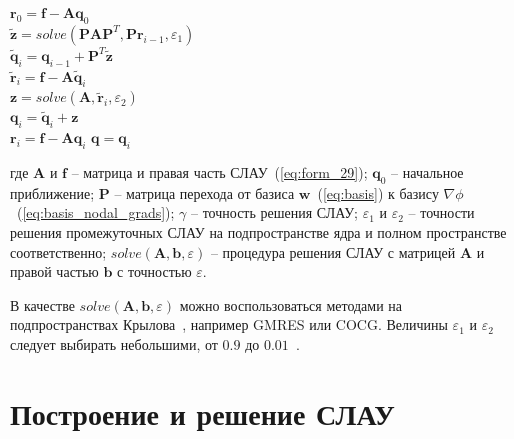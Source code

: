 \documentclass[a4paper,14pt]{article}
\makeatletter
\newcommand{\labelname}[1]{%
	\def\@currentlabelname{#1}}%
\makeatother
\begin{document}
\vspace{1em}
\begin{algorithm}[H]
	\SetAlgoLined
	$\mathbf{r}_0 = \mathbf{f} - \mathbf{A} \mathbf{q}_0$ \\
	{
		$\tilde{\mathbf{z}} = solve(\mathbf{P} \mathbf{A} \mathbf{P}^T , \mathbf{P} \mathbf{r}_{i-1} , \varepsilon_1 )$ \\
		$\tilde{\mathbf{q}}_{i} = \mathbf{q}_{i-1} + \mathbf{P}^T \tilde{\mathbf{z}}$ \\
		$\tilde{\mathbf{r}}_{i} = \mathbf{f} - \mathbf{A} \tilde{\mathbf{q}}_{i}$ \\
		$\mathbf{z} = solve(\mathbf{A}, \tilde{\mathbf{r}}_{i}, \varepsilon_2)$ \\
		$\mathbf{q}_{i} = \tilde{\mathbf{q}}_{i} + \mathbf{z}$ \\
		$\mathbf{r}_{i} = \mathbf{f} - \mathbf{A} \mathbf{q}_{i}$
	}
	$\mathbf{q} = \mathbf{q}_{i}$
\end{algorithm}
\vspace{1em}

\noindent где $\mathbf{A}$ и $\mathbf{f}$ -- матрица и правая часть СЛАУ~(\ref{eq:form_29}); $\mathbf{q}_0$ -- начальное приближение;  $\mathbf{P}$ -- матрица перехода от базиса $\mathbf{w}$~(\ref{eq:basis}) к базису $\nabla \phi$~(\ref{eq:basis_nodal_grads}); $\gamma$ -- точность решения СЛАУ; $\varepsilon_1$ и $\varepsilon_2$ -- точности решения промежуточных СЛАУ на подпространстве ядра и полном пространстве соответственно; $solve(\mathbf{A}, \mathbf{b}, \varepsilon)$ -- процедура решения СЛАУ с матрицей $\mathbf{A}$ и правой частью $\mathbf{b}$ с точностью $\varepsilon$.

В качестве $solve(\mathbf{A}, \mathbf{b}, \varepsilon)$ можно воспользоваться методами на подпространствах Крылова~\citep{balandin_slae, solver_saad, solver_iterative, solver_templates}, например GMRES или COCG. Величины $\varepsilon_1$ и $\varepsilon_2$ следует выбирать небольшими, от $0.9$ до $0.01$~\citep{nechaev}.
%


\clearpage
\section{Построение и решение СЛАУ}
\labelname{2}\label{sec:build_slae}
\end{document}
